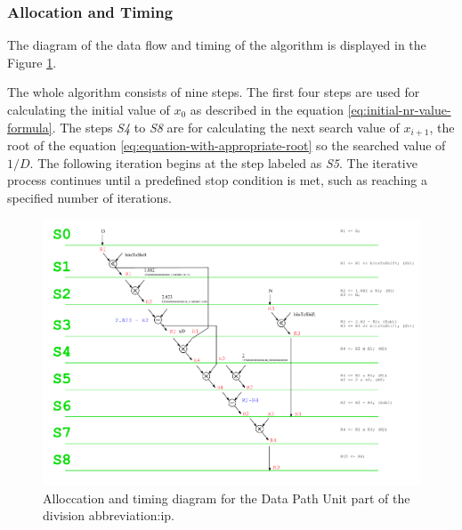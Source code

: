 \documentclass[a4paper, twoside, 11pt]{article}
\newcommand{\fbar}{\FloatBarrier}
\begin{document}
\subsubsection{Allocation and Timing}\label{subsubsec:division-allocation-and-timing}
The diagram of the data flow and timing of the algorithm is displayed in the Figure \ref{fig:division-allocation-timing}.\par
The whole algorithm consists of nine steps. The first four steps are used for calculating the initial value of $x_0$ as described in the equation \ref{eq:initial-nr-value-formula}. The steps \textit{S4} to \textit{S8} are for calculating the next search value of $x_{i+1}$, the root of the equation \ref{eq:equation-with-appropriate-root} so the searched value of $1/D$. The following iteration begins at the step labeled as \textit{S5}. The iterative process continues until a predefined stop condition is met, such as reaching a specified number of iterations.
\begin{figure}[htbp!]
  \centering
  \includegraphics[width=1\textwidth]{src/pdf/allocation-timing.pdf}
   \caption{Alloccation and timing diagram for the Data Path Unit part of the division \gls{abbreviation:ip}.}
  \label{fig:division-allocation-timing}
\end{figure}

\fbar
\end{document}
